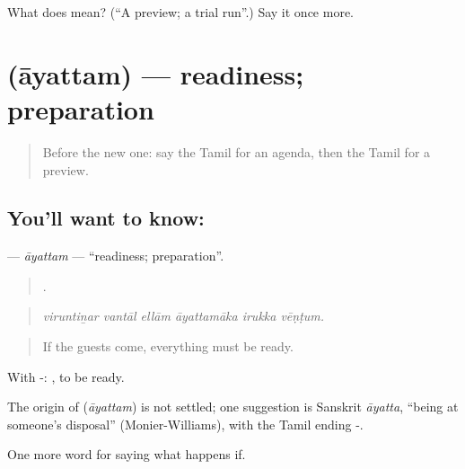 \begin{tcolorbox}[breakable,colback=teal!4,colframe=teal!35!black,title={Before you move on}]
What does  mean? (\textquotedblleft{}A preview; a trial run\textquotedblright{}.) Say it once more.
\end{tcolorbox}
\section[\texorpdfstring{\ta{ஆயத்தம்} (āyattam)}{ஆயத்தம் (āyattam)}]{ (āyattam) — readiness; preparation}

\label{lesson:TA-C549-ayattam}



\begin{quote}
Before the new one: say the Tamil for an agenda, then the Tamil for a preview.
\end{quote}

\subsection*{You'll want to know: }
\textbf{} — \emph{āyattam} — \textquotedblleft{}readiness; preparation\textquotedblright{}.

\begin{quote}
     .
\end{quote}

\begin{quote}
\emph{viruntiṉar vantāl ellām āyattamāka irukka vēṇṭum.}
\end{quote}

\begin{quote}
If the guests come, everything must be ready.
\end{quote}

With -:  , to be ready.

\begin{cousinweb}
The origin of \textbf{} (\emph{āyattam}) is not settled; one suggestion is Sanskrit \emph{āyatta}, \textquotedblleft{}being at someone's disposal\textquotedblright{} (Monier-Williams), with the Tamil ending -.
\end{cousinweb}

\begin{grammarlens}[title={What you've built}]
One more word for saying what happens if.
\end{grammarlens}

